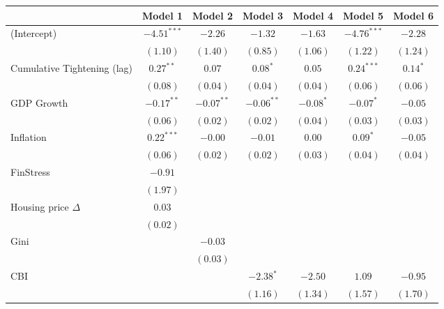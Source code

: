 
\begin{tabular}{l c c c c c c }
\hline
 & Model 1 & Model 2 & Model 3 & Model 4 & Model 5 & Model 6 \\
\hline
(Intercept)                 & $-4.51^{***}$ & $-2.26$      & $-1.32$      & $-1.63$     & $-4.76^{***}$ & $-2.28$    \\
                            & $(1.10)$      & $(1.40)$     & $(0.85)$     & $(1.06)$    & $(1.22)$      & $(1.24)$   \\
Cumulative Tightening (lag) & $0.27^{**}$   & $0.07$       & $0.08^{*}$   & $0.05$      & $0.24^{***}$  & $0.14^{*}$ \\
                            & $(0.08)$      & $(0.04)$     & $(0.04)$     & $(0.04)$    & $(0.06)$      & $(0.06)$   \\
GDP Growth                  & $-0.17^{**}$  & $-0.07^{**}$ & $-0.06^{**}$ & $-0.08^{*}$ & $-0.07^{*}$   & $-0.05$    \\
                            & $(0.06)$      & $(0.02)$     & $(0.02)$     & $(0.04)$    & $(0.03)$      & $(0.03)$   \\
Inflation                   & $0.22^{***}$  & $-0.00$      & $-0.01$      & $0.00$      & $0.09^{*}$    & $-0.05$    \\
                            & $(0.06)$      & $(0.02)$     & $(0.02)$     & $(0.03)$    & $(0.04)$      & $(0.04)$   \\
FinStress                   & $-0.91$       &              &              &             &               &            \\
                            & $(1.97)$      &              &              &             &               &            \\
Housing price $\Delta$      & $0.03$        &              &              &             &               &            \\
                            & $(0.02)$      &              &              &             &               &            \\
Gini                        &               & $-0.03$      &              &             &               &            \\
                            &               & $(0.03)$     &              &             &               &            \\
CBI                         &               &              & $-2.38^{*}$  & $-2.50$     & $1.09$        & $-0.95$    \\
                            &               &              & $(1.16)$     & $(1.34)$    & $(1.57)$      & $(1.70)$   \\

\end{tabular}
